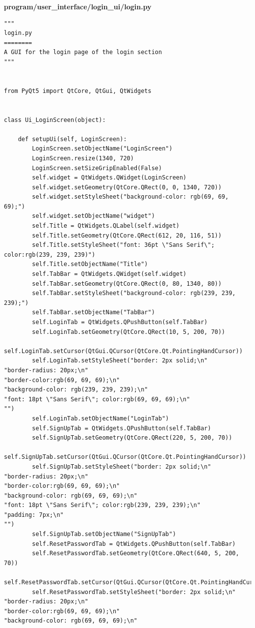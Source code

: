 \documentclass[12pt]{article}
\begin{document}
\textbf{program/user\_interface/login\_ui/login.py}
\begin{lstlisting}
"""
login.py
========
A GUI for the login page of the login section
"""


from PyQt5 import QtCore, QtGui, QtWidgets


class Ui_LoginScreen(object):

    def setupUi(self, LoginScreen):
        LoginScreen.setObjectName("LoginScreen")
        LoginScreen.resize(1340, 720)
        LoginScreen.setSizeGripEnabled(False)
        self.widget = QtWidgets.QWidget(LoginScreen)
        self.widget.setGeometry(QtCore.QRect(0, 0, 1340, 720))
        self.widget.setStyleSheet("background-color: rgb(69, 69, 69);")
        self.widget.setObjectName("widget")
        self.Title = QtWidgets.QLabel(self.widget)
        self.Title.setGeometry(QtCore.QRect(612, 20, 116, 51))
        self.Title.setStyleSheet("font: 36pt \"Sans Serif\"; color:rgb(239, 239, 239)")
        self.Title.setObjectName("Title")
        self.TabBar = QtWidgets.QWidget(self.widget)
        self.TabBar.setGeometry(QtCore.QRect(0, 80, 1340, 80))
        self.TabBar.setStyleSheet("background-color: rgb(239, 239, 239);")
        self.TabBar.setObjectName("TabBar")
        self.LoginTab = QtWidgets.QPushButton(self.TabBar)
        self.LoginTab.setGeometry(QtCore.QRect(10, 5, 200, 70))
        self.LoginTab.setCursor(QtGui.QCursor(QtCore.Qt.PointingHandCursor))
        self.LoginTab.setStyleSheet("border: 2px solid;\n"
"border-radius: 20px;\n"
"border-color:rgb(69, 69, 69);\n"
"background-color: rgb(239, 239, 239);\n"
"font: 18pt \"Sans Serif\"; color:rgb(69, 69, 69);\n"
"")
        self.LoginTab.setObjectName("LoginTab")
        self.SignUpTab = QtWidgets.QPushButton(self.TabBar)
        self.SignUpTab.setGeometry(QtCore.QRect(220, 5, 200, 70))
        self.SignUpTab.setCursor(QtGui.QCursor(QtCore.Qt.PointingHandCursor))
        self.SignUpTab.setStyleSheet("border: 2px solid;\n"
"border-radius: 20px;\n"
"border-color:rgb(69, 69, 69);\n"
"background-color: rgb(69, 69, 69);\n"
"font: 18pt \"Sans Serif\"; color:rgb(239, 239, 239);\n"
"padding: 7px;\n"
"")
        self.SignUpTab.setObjectName("SignUpTab")
        self.ResetPasswordTab = QtWidgets.QPushButton(self.TabBar)
        self.ResetPasswordTab.setGeometry(QtCore.QRect(640, 5, 200, 70))
        self.ResetPasswordTab.setCursor(QtGui.QCursor(QtCore.Qt.PointingHandCursor))
        self.ResetPasswordTab.setStyleSheet("border: 2px solid;\n"
"border-radius: 20px;\n"
"border-color:rgb(69, 69, 69);\n"
"background-color: rgb(69, 69, 69);\n"

\end{lstlisting}
\end{document}
